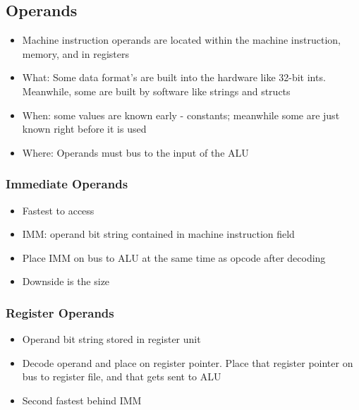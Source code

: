 \documentclass{article}
\begin{document}
 \subsection{Operands}
 \begin{itemize}
 
 \item Machine instruction operands are located within the machine instruction, memory, and in registers
 
     \item What: Some data format's are built into the hardware like 32-bit ints. Meanwhile, some are built by software like strings and structs
     
     \item When: some values are known early - constants; meanwhile some are just known right before it is used
     
     \item Where: Operands must bus to the input of the ALU
     
     
 \end{itemize}
 
 \subsubsection{Immediate Operands}
 
 \begin{itemize}
 
 \item Fastest to access
     \item IMM: operand bit string contained in machine instruction field
     
     \item Place IMM on bus to ALU at the same time as opcode after decoding
     
     \item Downside is the size
     
     
 \end{itemize}
 
 \subsubsection{Register Operands}

\begin{itemize}
    \item Operand bit string stored in register unit 
    \item Decode operand and place on register pointer. Place that register pointer on bus to register file, and that gets sent to ALU
    \item Second fastest behind IMM
\end{itemize}
\end{document}
